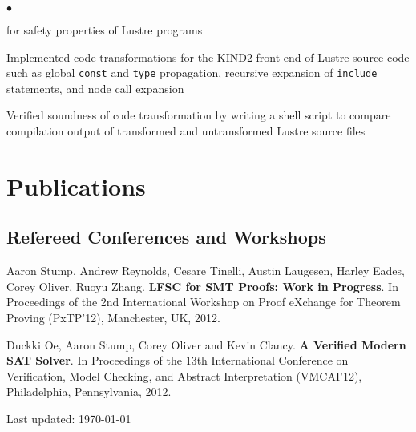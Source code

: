 \documentclass[10pt,letterpaper]{article}
\renewenvironment{itemize}{
  \begin{list}{}{
      \setlength{\leftmargin}{1.5em}
      \setlength{\itemsep}{0.25em}
      \setlength{\parskip}{0pt}
      \setlength{\parsep}{0.25em}
    }
  }{
  \end{list}
}
\newenvironment{bitemize}{
  \begin{list}{\(\bullet \)}{
      \setlength{\leftmargin}{1.5em}
      \setlength{\itemsep}{0.25em}
      \setlength{\parskip}{0pt}
      \setlength{\parsep}{0.25em}
    }
  }{
  \end{list}
}
\begin{document}
\begin{itemize}
\begin{bitemize}
    for safety properties of Lustre programs
  \item Implemented code transformations for the KIND2 front-end of Lustre
    source code such as global \texttt{const} and \texttt{type} propagation,
    recursive expansion of \texttt{include} statements, and node call expansion
  \item Verified soundness of code transformation by writing a shell script to
    compare compilation output of transformed and untransformed Lustre source
    files
  \end{bitemize}
\end{itemize}

\section*{Publications}

\subsection*{Refereed Conferences and Workshops}

\begin{itemize}
  {\item Aaron Stump, Andrew Reynolds, Cesare Tinelli, Austin Laugesen, Harley
    Eades, Corey Oliver, Ruoyu Zhang. \textbf{LFSC for SMT Proofs: Work in
    Progress}. In Proceedings of the 2nd International Workshop on Proof
    eXchange for Theorem Proving (PxTP'12), Manchester, UK, 2012.}
\end{itemize}

\begin{itemize}
  {\item Duckki Oe, Aaron Stump, Corey Oliver and Kevin Clancy. \textbf{A
    Verified Modern SAT Solver}. In Proceedings of the 13th International
    Conference on Verification, Model Checking, and Abstract Interpretation
    (VMCAI'12), Philadelphia, Pennsylvania, 2012.}
\end{itemize}

\medskip

\begin{center}
  \begin{small}
    Last updated: \today
  \end{small}
\end{center}
\end{document}
